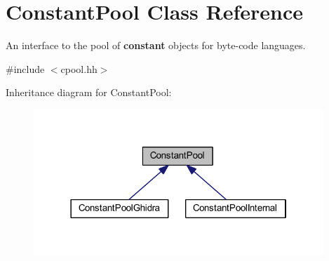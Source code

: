 \hypertarget{class_constant_pool}{}\section{Constant\+Pool Class Reference}
\label{class_constant_pool}


An interface to the pool of {\bfseries{constant}} objects for byte-\/code languages.  




{\ttfamily \#include $<$cpool.\+hh$>$}



Inheritance diagram for Constant\+Pool\+:
\nopagebreak
\begin{figure}[H]
\begin{center}
\leavevmode
\includegraphics[width=310pt]{class_constant_pool__inherit__graph}
\end{center}
\end{figure}
